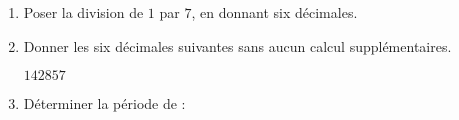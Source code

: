 \begin{corrige}
    \begin{enumerate}
        \item Poser la division de $1$ par $7$, en donnant six décimales.
        
        \item Donner les six décimales suivantes sans aucun calcul supplémentaires.
        
        {\red $142857$}
        \item Déterminer la période de :
        \begin{multicols}{2}            
            \begin{enumerate}
            \end{enumerate}
        \end{multicols}
    \end{enumerate}
\end{corrige}

